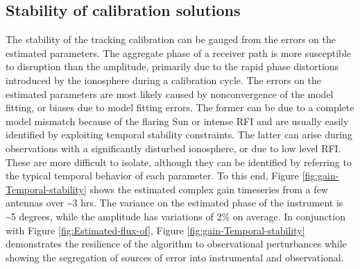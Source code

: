 \documentclass[referee]{aa}
\begin{document}
\subsection{\label{sub:Stability}Stability of calibration solutions}
The stability of  the tracking calibration can be gauged from  the errors on the
estimated parameters. The aggregate phase of a receiver path is more susceptible
to disruption than  the amplitude, primarily due to  the rapid phase distortions
introduced  by the  ionosphere during  a calibration  cycle. The  errors  on the
estimated  parameters are  most likely  caused by  nonconvergence of  the model
fitting, or  biases due  to model  fitting errors. The  former can  be due  to a
complete  model mismatch  because of  the flaring  Sun or  intense RFI  and are
usually  easily identified  by exploiting  temporal stability  constraints.  The
latter can arise during  observations with a significantly disturbed ionosphere,
or due to low level RFI.  These are more difficult to isolate, although they can
be identified by referring to  the typical temporal behavior of each parameter.
To  this  end,  Figure  \ref{fig:gain-Temporal-stability}  shows  the  estimated
complex gain  timeseries from a  few antennas over \textasciitilde{}3  hrs.  The
variance on the estimated phase of the instrument is \textasciitilde{}5 degrees,
while  the amplitude  has variations  of 2\%  on average.   In  conjunction with
Figure   \ref{fig:Estimated-flux-of},   Figure  \ref{fig:gain-Temporal-stability}
demonstrates  the resilience  of  the algorithm  to observational  perturbances
while  showing  the  segregation  of  sources of  error  into  instrumental  and
observational.
\end{document}
